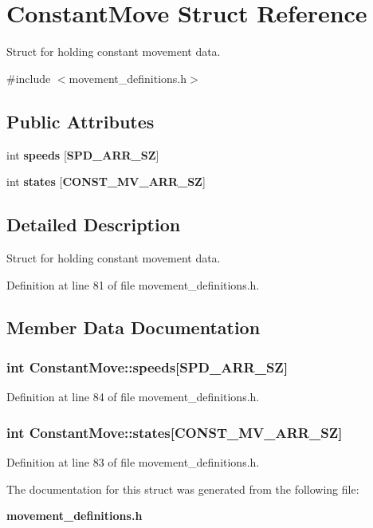 \section{\-Constant\-Move \-Struct \-Reference}
\label{structConstantMove}


\-Struct for holding constant movement data.  




{\ttfamily \#include $<$movement\-\_\-definitions.\-h$>$}

\subsection*{\-Public \-Attributes}
\begin{DoxyCompactItemize}
\item 
int {\bf speeds} [{\bf \-S\-P\-D\-\_\-\-A\-R\-R\-\_\-\-S\-Z}]
\item 
int {\bf states} [{\bf \-C\-O\-N\-S\-T\-\_\-\-M\-V\-\_\-\-A\-R\-R\-\_\-\-S\-Z}]
\end{DoxyCompactItemize}


\subsection{\-Detailed \-Description}
\-Struct for holding constant movement data. 

\-Definition at line 81 of file movement\-\_\-definitions.\-h.



\subsection{\-Member \-Data \-Documentation}
\subsubsection[{speeds}]{\setlength{\rightskip}{0pt plus 5cm}int {\bf \-Constant\-Move\-::speeds}[{\bf \-S\-P\-D\-\_\-\-A\-R\-R\-\_\-\-S\-Z}]}\label{structConstantMove_a5c8f7515c66ed62480950f5937037f09}


\-Definition at line 84 of file movement\-\_\-definitions.\-h.

\subsubsection[{states}]{\setlength{\rightskip}{0pt plus 5cm}int {\bf \-Constant\-Move\-::states}[{\bf \-C\-O\-N\-S\-T\-\_\-\-M\-V\-\_\-\-A\-R\-R\-\_\-\-S\-Z}]}\label{structConstantMove_a4e63d2d1fa0a42d2a462cd9ad3a7b9f2}


\-Definition at line 83 of file movement\-\_\-definitions.\-h.



\-The documentation for this struct was generated from the following file\-:\begin{DoxyCompactItemize}
\item 
{\bf movement\-\_\-definitions.\-h}\end{DoxyCompactItemize}
